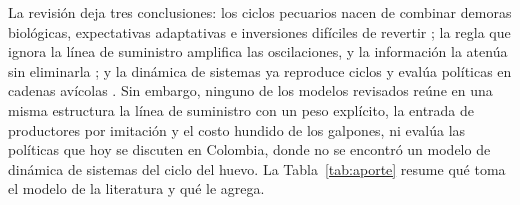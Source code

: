 \documentclass[preprint,12pt,authoryear]{elsarticle}
\begin{document}
La revisión deja tres conclusiones: los ciclos pecuarios nacen de combinar demoras biológicas, expectativas adaptativas e inversiones difíciles de revertir \citep{Meadows1969,Rosen1994,BergHuffaker2015}; la regla que ignora la línea de suministro amplifica las oscilaciones, y la información la atenúa sin eliminarla \citep{Sterman1989b,CrosonDonohue2006,KampmannSterman2014}; y la dinámica de sistemas ya reproduce ciclos y evalúa políticas en cadenas avícolas \citep{VoThiel2011,Haryana2026}. Sin embargo, ninguno de los modelos revisados reúne en una misma estructura la línea de suministro con un peso explícito, la entrada de productores por imitación y el costo hundido de los galpones, ni evalúa las políticas que hoy se discuten en Colombia, donde no se encontró un modelo de dinámica de sistemas del ciclo del huevo. La Tabla~\ref{tab:aporte} resume qué toma el modelo de la literatura y qué le agrega.
\end{document}
